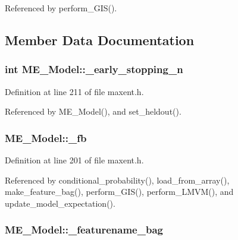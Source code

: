 Referenced by perform\_\-GIS().

\subsection{Member Data Documentation}
\hypertarget{classME__Model_8d93484c679c42bbedf68c8a6bde5d9c}{
\subsubsection[{\_\-early\_\-stopping\_\-n}]{\setlength{\rightskip}{0pt plus 5cm}int {\bf ME\_\-Model::\_\-early\_\-stopping\_\-n}}}
\label{classME__Model_8d93484c679c42bbedf68c8a6bde5d9c}




Definition at line 211 of file maxent.h.

Referenced by ME\_\-Model(), and set\_\-heldout().\hypertarget{classME__Model_b52455eefd6359c8d38631f712a07c5c}{
\subsubsection[{\_\-fb}]{ {\bf ME\_\-Model::\_\-fb}}}
\label{classME__Model_b52455eefd6359c8d38631f712a07c5c}




Definition at line 201 of file maxent.h.

Referenced by conditional\_\-probability(), load\_\-from\_\-array(), make\_\-feature\_\-bag(), perform\_\-GIS(), perform\_\-LMVM(), and update\_\-model\_\-expectation().\hypertarget{classME__Model_97517bda659bd3137e6e94810f08897d}{
\subsubsection[{\_\-featurename\_\-bag}]{ {\bf ME\_\-Model::\_\-featurename\_\-bag}}}
\label{classME__Model_97517bda659bd3137e6e94810f08897d}




